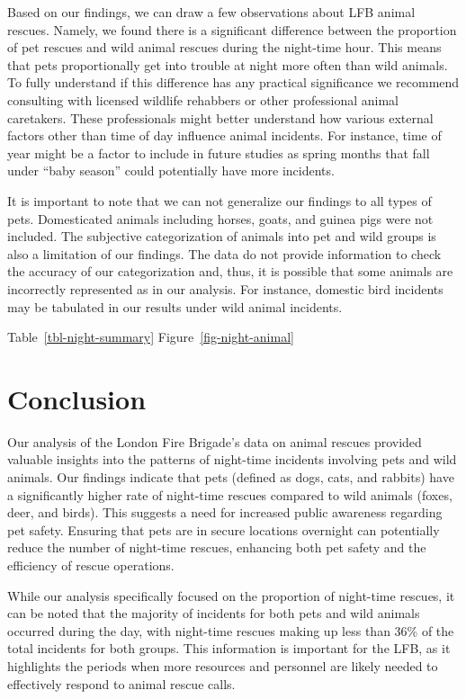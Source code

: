 \documentclass[
]{article}
\begin{document}
Based on our findings, we can draw a few observations about LFB animal
rescues. Namely, we found there is a significant difference between the
proportion of pet rescues and wild animal rescues during the night-time
hour. This means that pets proportionally get into trouble at night more
often than wild animals. To fully understand if this difference has any
practical significance we recommend consulting with licensed wildlife
rehabbers or other professional animal caretakers. These professionals
might better understand how various external factors other than time of
day influence animal incidents. For instance, time of year might be a
factor to include in future studies as spring months that fall under
``baby season'' could potentially have more incidents.

It is important to note that we can not generalize our findings to all
types of pets. Domesticated animals including horses, goats, and guinea
pigs were not included. The subjective categorization of animals into
pet and wild groups is also a limitation of our findings. The data do
not provide information to check the accuracy of our categorization and,
thus, it is possible that some animals are incorrectly represented as in
our analysis. For instance, domestic bird incidents may be tabulated in
our results under wild animal incidents.

Table~\ref{tbl-night-summary} Figure~\ref{fig-night-animal}

\hypertarget{conclusion}{%
\section{Conclusion}\label{conclusion}}

Our analysis of the London Fire Brigade's data on animal rescues
provided valuable insights into the patterns of night-time incidents
involving pets and wild animals. Our findings indicate that pets
(defined as dogs, cats, and rabbits) have a significantly higher rate of
night-time rescues compared to wild animals (foxes, deer, and birds).
This suggests a need for increased public awareness regarding pet
safety. Ensuring that pets are in secure locations overnight can
potentially reduce the number of night-time rescues, enhancing both pet
safety and the efficiency of rescue operations.

While our analysis specifically focused on the proportion of night-time
rescues, it can be noted that the majority of incidents for both pets
and wild animals occurred during the day, with night-time rescues making
up less than 36\% of the total incidents for both groups. This
information is important for the LFB, as it highlights the periods when
more resources and personnel are likely needed to effectively respond to
animal rescue calls.
\end{document}
